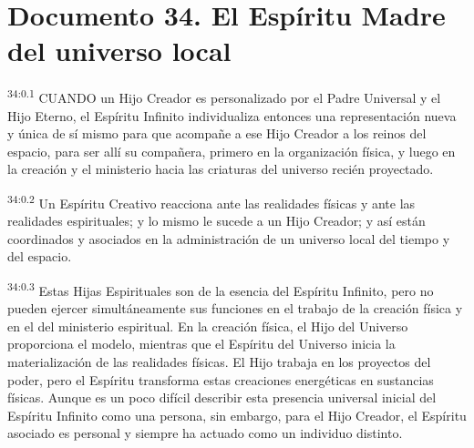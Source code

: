 \chapter{Documento 34. El Espíritu Madre del universo local}
\par
\textsuperscript{34:0.1} CUANDO un Hijo Creador es personalizado por el Padre Universal y el Hijo Eterno, el Espíritu Infinito individualiza entonces una representación nueva y única de sí mismo para que acompañe a ese Hijo Creador a los reinos del espacio, para ser allí su compañera, primero en la organización física, y luego en la creación y el ministerio hacia las criaturas del universo recién proyectado.

\par
\textsuperscript{34:0.2} Un Espíritu Creativo reacciona ante las realidades físicas y ante las realidades espirituales; y lo mismo le sucede a un Hijo Creador; y así están coordinados y asociados en la administración de un universo local del tiempo y del espacio.

\par
\textsuperscript{34:0.3} Estas Hijas Espirituales son de la esencia del Espíritu Infinito, pero no pueden ejercer simultáneamente sus funciones en el trabajo de la creación física y en el del ministerio espiritual. En la creación física, el Hijo del Universo proporciona el modelo, mientras que el Espíritu del Universo inicia la materialización de las realidades físicas. El Hijo trabaja en los proyectos del poder, pero el Espíritu transforma estas creaciones energéticas en sustancias físicas. Aunque es un poco difícil describir esta presencia universal inicial del Espíritu Infinito como una persona, sin embargo, para el Hijo Creador, el Espíritu asociado es personal y siempre ha actuado como un individuo distinto.

